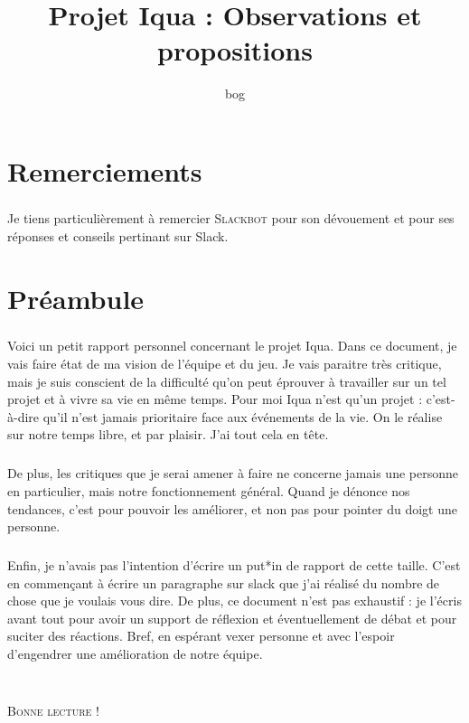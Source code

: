 \documentclass{report}
\author{bog}
\title{Projet Iqua : Observations et propositions}
\begin{document}
\maketitle{}

\tableofcontents{}

\chapter*{Remerciements}

\paragraph{}
Je tiens particulièrement à remercier \textsc{Slackbot} pour son dévouement et pour ses réponses et conseils pertinant sur Slack.

\newpage
\chapter{Préambule}
\paragraph{}
Voici un petit rapport personnel concernant le projet Iqua. Dans ce document, je vais faire état de ma vision de l'équipe et du jeu. Je vais paraitre très critique, mais je suis conscient de la difficulté qu'on peut éprouver à travailler sur un tel projet et à vivre sa vie en même temps. Pour moi Iqua n'est qu'un projet : c'est-à-dire qu'il n'est jamais prioritaire face aux événements de la vie. On le réalise sur notre temps libre, et par plaisir. J'ai tout cela en tête.

\paragraph{}
De plus, les critiques que je serai amener à faire ne concerne jamais une personne en particulier, mais notre fonctionnement général. Quand je dénonce nos tendances, c'est pour pouvoir les améliorer, et non pas pour pointer du doigt une personne.

\paragraph{}
Enfin, je n'avais pas l'intention d'écrire un put*in de rapport de cette taille. C'est en commençant à écrire un paragraphe sur slack que j'ai réalisé du nombre de chose que je voulais vous dire. De plus, ce document n'est pas exhaustif : je l'écris avant tout pour avoir un support de réflexion et éventuellement de débat et pour suciter des réactions. Bref, en espérant vexer personne et avec l'espoir d'engendrer une amélioration de notre équipe.
\\ \\
\begin{center}
  \paragraph{}
  \textsc{Bonne lecture !}
\end{center}
\end{document}
